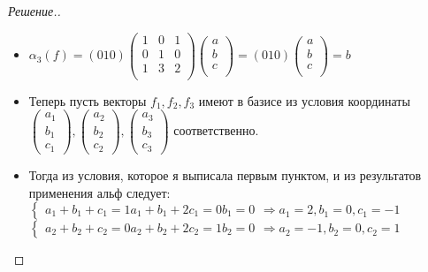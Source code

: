 \documentclass[a4paper]{article}
\theoremstyle{remark}
\begin{document}
\begin{proof}[Решение.]
\begin{itemize}
            \item  $\alpha_3(f) = (0 1 0)\left(\begin{matrix}
              1 & 0 & 1 \\
              0 & 1 & 0 \\
              1 & 3 & 2 \\ 
          \end{matrix}\right) \left(\begin{matrix}
              a \\
              b\\
              c \\  
          \end{matrix}\right) = (0 1 0) \left(\begin{matrix}
              a \\
              b\\
              c\\  
          \end{matrix}\right) = b$
          \item Теперь пусть векторы $f_1, f_2, f_3$ имеют в базисе из условия координаты 
          $\left(\begin{matrix}
              a_1 \\
              b_1 \\
              c_1  
          \end{matrix}\right),           \left(\begin{matrix}
            a_2 \\
            b_2 \\
            c_2  
        \end{matrix}\right),           \left(\begin{matrix}
          a_3 \\
          b_3 \\
          c_3  
      \end{matrix}\right)$ соответственно.
      \item Тогда из условия, которое я выписала первым пунктом, и из
      результатов применения альф следует: 
      $\begin{cases}
          a_1 + b_1 + c_1 = 1
          a_1 + b_1 + 2c_1 = 0
          b_1 = 0
      \end{cases} \Rightarrow a_1 = 2, b_1 = 0, c_1 = -1$ \\
      $\begin{cases}
        a_2 + b_2 + c_2 = 0
        a_2 + b_2 + 2c_2 = 1
        b_2 = 0
    \end{cases} \Rightarrow a_2 = -1, b_2 = 0, c_2 = 1$ \\

\end{itemize}
\end{proof}
\end{document}
